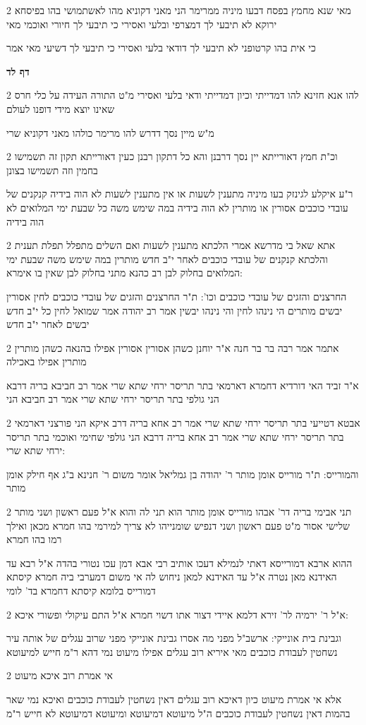 \documentclass[12pt, openany]{book}
\newcommand{\sethebfont}{
\fontsize{10.5pt}{21.0pt} \selectfont
}
\newcommand{\twocol}[1]{
	{\sethebfont \begin{multicols}{2}
			#1
	\end{multicols}}	
}
\newcommand{\sectname}{}
\newcommand{\newsection}[1]{
	\addcontentsline{toc}{section}{#1}
	\renewcommand{\sectname}{#1}	
	\vspace{-\baselineskip}
	\begin{center}
		\textbf{%
\fontsize{16pt}{16pt}\selectfont
			#1}
	\end{center}
	\vspace{-\baselineskip}
	\nopagebreak
}
\begin{document}
\twocol{מאי שנא מחמץ בפסח דבעו מיניה ממרימר הני מאני דקוניא מהו לאשתמושי בהו בפיסחא ירוקא לא תיבעי לך דמצרפי ובלעי ואסירי כי תיבעי לך חיורי ואוכמי מאי
\par כי אית בהו קרטופני לא תיבעי לך דודאי בלעי ואסירי כי תיבעי לך דשיעי מאי אמר}
\newsection{דף לד}
\twocol{להו אנא חזינא להו דמדייתי וכיון דמדייתי ודאי בלעי ואסירי מ"ט התורה העידה על כלי חרס שאינו יוצא מידי דופנו לעולם
\par מ"ש מיין נסך דדרש להו מרימר כולהו מאני דקוניא שרי}
\twocol{וכ"ת חמץ דאורייתא יין נסך דרבנן והא כל דתקון רבנן כעין דאורייתא תקון זה תשמישו בחמין וזה תשמישו בצונן
\par ר"ע איקלע לגינזק בעו מיניה מתענין לשעות או אין מתענין לשעות לא הוה בידיה קנקנים של עובדי כוכבים אסורין או מותרין לא הוה בידיה במה שימש משה כל שבעת ימי המלואים לא הוה בידיה}
\twocol{אתא שאל בי מדרשא אמרי הלכתא מתענין לשעות ואם השלים מתפלל תפלת תענית והלכתא קנקנים של עובדי כוכבים לאחר י"ב חדש מותרין במה שימש משה שבעת ימי המלואים בחלוק לבן רב כהנא מתני בחלוק לבן שאין בו אימרא:
\par החרצנים והזגים של עובדי כוכבים וכו': ת"ר החרצנים והזגים של עובדי כוכבים לחין אסורין יבשים מותרים הי נינהו לחין והי נינהו יבשין אמר רב יהודה אמר שמואל לחין כל י"ב חדש יבשים לאחר י"ב חדש}
\twocol{אתמר אמר רבה בר בר חנה א"ר יוחנן כשהן אסורין אסורין אפילו בהנאה כשהן מותרין מותרין אפילו באכילה
\par א"ר זביד האי דורדיא דחמרא דארמאי בתר תריסר ירחי שתא שרי אמר רב חביבא בריה דרבא הני גולפי בתר תריסר ירחי שתא שרי אמר רב חביבא הני}
\twocol{אבטא דטייעי בתר תריסר ירחי שתא שרי אמר רב אחא בריה דרב איקא הני פורצני דארמאי בתר תריסר ירחי שתא שרי אמר רב אחא בריה דרבא הני גולפי שחימי ואוכמי בתר תריסר ירחי שתא שרי:
\par והמורייס: ת"ר מורייס אומן מותר ר' יהודה בן גמליאל אומר משום ר' חנינא ב"ג אף חילק אומן מותר}
\twocol{תני אבימי בריה דר' אבהו מורייס אומן מותר הוא תני לה והוא א"ל פעם ראשון ושני מותר שלישי אסור מ"ט פעם ראשון ושני דנפיש שומנייהו לא צריך למירמי בהו חמרא מכאן ואילך רמו בהו חמרא
\par ההוא ארבא דמורייסא דאתי לנמילא דעכו אותיב רבי אבא דמן עכו נטורי בהדה א"ל רבא עד האידנא מאן נטרה א"ל עד האידנא למאן ניחוש לה אי משום דמערבי ביה חמרא קיסתא דמורייס בלומא קיסתא דחמרא בד' לומי}
\twocol{א"ל ר' ירמיה לר' זירא דלמא איידי דצור אתו דשוי חמרא א"ל התם עיקולי ופשורי איכא:
\par וגבינת בית אונייקי: ארשב"ל מפני מה אסרו גבינת אונייקי מפני שרוב עגלים של אותה עיר נשחטין לעבודת כוכבים מאי איריא רוב עגלים אפילו מיעוט נמי דהא ר"מ חייש למיעוטא}
\twocol{אי אמרת רוב איכא מיעוט
\par אלא אי אמרת מיעוט כיון דאיכא רוב עגלים דאין נשחטין לעבודת כוכבים ואיכא נמי שאר בהמות דאין נשחטין לעבודת כוכבים ה"ל מיעוטא דמיעוטא ומיעוטא דמיעוטא לא חייש ר"מ}
\end{document}
